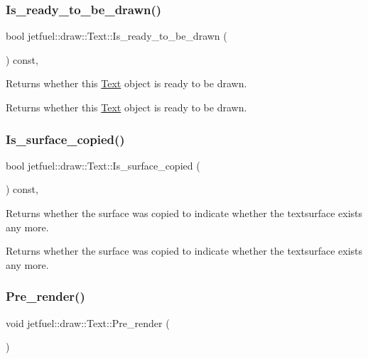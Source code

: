 \subsubsection{\texorpdfstring{Is\+\_\+ready\+\_\+to\+\_\+be\+\_\+drawn()}{Is\_ready\_to\_be\_drawn()}}
{\footnotesize\ttfamily bool jetfuel\+::draw\+::\+Text\+::\+Is\+\_\+ready\+\_\+to\+\_\+be\+\_\+drawn (\begin{DoxyParamCaption}{ }\end{DoxyParamCaption}) const\hspace{0.3cm}{\ttfamily [inline]}, {\ttfamily [protected]}}



Returns whether this \hyperlink{classjetfuel_1_1draw_1_1Text}{Text} object is ready to be drawn. 

Returns whether this \hyperlink{classjetfuel_1_1draw_1_1Text}{Text} object is ready to be drawn. \mbox{\label{classjetfuel_1_1draw_1_1Text_a3095fe89cec6db7a6a38f722dc249ccb}} 
\subsubsection{\texorpdfstring{Is\+\_\+surface\+\_\+copied()}{Is\_surface\_copied()}}
{\footnotesize\ttfamily bool jetfuel\+::draw\+::\+Text\+::\+Is\+\_\+surface\+\_\+copied (\begin{DoxyParamCaption}{ }\end{DoxyParamCaption}) const\hspace{0.3cm}{\ttfamily [inline]}, {\ttfamily [protected]}}



Returns whether the surface was copied to indicate whether the textsurface exists any more. 

Returns whether the surface was copied to indicate whether the textsurface exists any more. \mbox{\label{classjetfuel_1_1draw_1_1Text_ae25b3503ec6fcf36aaeebf4e08612394}} 
\subsubsection{\texorpdfstring{Pre\+\_\+render()}{Pre\_render()}}
{\footnotesize\ttfamily void jetfuel\+::draw\+::\+Text\+::\+Pre\+\_\+render (\begin{DoxyParamCaption}{ }\end{DoxyParamCaption})\hspace{0.3cm}{\ttfamily [protected]}}



